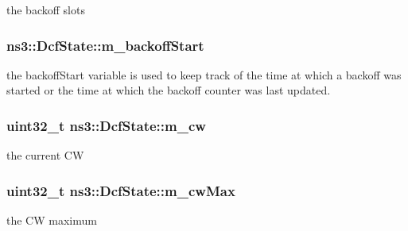 the backoff slots 

\subsubsection[{\texorpdfstring{m\+\_\+backoff\+Start}{m_backoffStart}}]{ ns3\+::\+Dcf\+State\+::m\+\_\+backoff\+Start\hspace{0.3cm}{\ttfamily [protected]}}\hypertarget{classns3_1_1DcfState_a311dab0ea8b81d0d9ac74bc3294957cd}{}\label{classns3_1_1DcfState_a311dab0ea8b81d0d9ac74bc3294957cd}
the backoff\+Start variable is used to keep track of the time at which a backoff was started or the time at which the backoff counter was last updated. 
\subsubsection[{\texorpdfstring{m\+\_\+cw}{m_cw}}]{\setlength{\rightskip}{0pt plus 5cm}uint32\+\_\+t ns3\+::\+Dcf\+State\+::m\+\_\+cw\hspace{0.3cm}{\ttfamily [protected]}}\hypertarget{classns3_1_1DcfState_a62928225e740026ae4e8f185ee6d38d2}{}\label{classns3_1_1DcfState_a62928225e740026ae4e8f185ee6d38d2}


the current CW 

\subsubsection[{\texorpdfstring{m\+\_\+cw\+Max}{m_cwMax}}]{\setlength{\rightskip}{0pt plus 5cm}uint32\+\_\+t ns3\+::\+Dcf\+State\+::m\+\_\+cw\+Max\hspace{0.3cm}{\ttfamily [protected]}}\hypertarget{classns3_1_1DcfState_aadd07edcf59493e63a00c4de179a650f}{}\label{classns3_1_1DcfState_aadd07edcf59493e63a00c4de179a650f}


the CW maximum 

